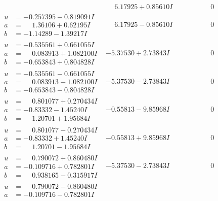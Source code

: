 \documentclass[1p]{elsarticle_modified}
\theoremstyle{definition}
\begin{document}
$$\begin{array}{c|c|c}
 & \phantom{-}6.17925 + 0.85610 I & \phantom{-0.000000 } 0 \\ \hline\begin{aligned}
u &= -0.257395 - 0.819091 I \\
a &= \phantom{-}1.36106 + 0.62195 I \\
b &= -1.14289 - 1.39217 I\end{aligned}
 & \phantom{-}6.17925 - 0.85610 I & \phantom{-0.000000 } 0 \\ \hline\begin{aligned}
u &= -0.535561 + 0.661055 I \\
a &= \phantom{-}0.083913 + 1.082100 I \\
b &= -0.653843 + 0.804828 I\end{aligned}
 & -5.37530 + 2.73843 I & \phantom{-0.000000 } 0 \\ \hline\begin{aligned}
u &= -0.535561 - 0.661055 I \\
a &= \phantom{-}0.083913 - 1.082100 I \\
b &= -0.653843 - 0.804828 I\end{aligned}
 & -5.37530 - 2.73843 I & \phantom{-0.000000 } 0 \\ \hline\begin{aligned}
u &= \phantom{-}0.801077 + 0.270434 I \\
a &= -0.83332 - 1.45240 I \\
b &= \phantom{-}1.20701 + 1.95684 I\end{aligned}
 & -0.55813 - 9.85968 I & \phantom{-0.000000 } 0 \\ \hline\begin{aligned}
u &= \phantom{-}0.801077 - 0.270434 I \\
a &= -0.83332 + 1.45240 I \\
b &= \phantom{-}1.20701 - 1.95684 I\end{aligned}
 & -0.55813 + 9.85968 I & \phantom{-0.000000 } 0 \\ \hline\begin{aligned}
u &= \phantom{-}0.790072 + 0.860480 I \\
a &= -0.109716 + 0.782801 I \\
b &= \phantom{-}0.938165 - 0.315917 I\end{aligned}
 & -5.37530 - 2.73843 I & \phantom{-0.000000 } 0 \\ \hline\begin{aligned}
u &= \phantom{-}0.790072 - 0.860480 I \\
a &= -0.109716 - 0.782801 I \\

\end{aligned}
\end{array}$$
\end{document}
